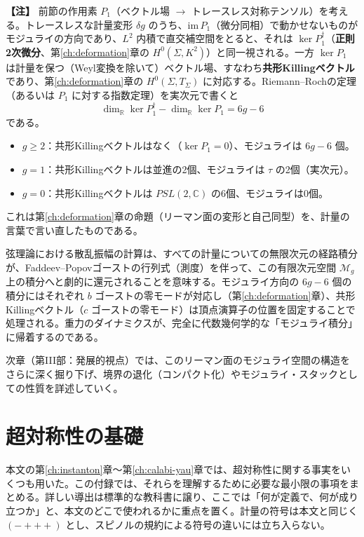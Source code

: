 \documentclass[uplatex, dvipdfmx, book]{jsbook}
\let\origsection\section
\let\origsubsection\subsection
\let\origsubsubsection\subsubsection
\newcommand{\chapter}{\origsection}
\renewcommand{\section}{\origsubsection}
\renewcommand{\subsection}{\origsubsubsection}
\renewcommand{\subsubsection}{\paragraph}
\newenvironment{note}{\vspace{1ex}\par\footnotesize\noindent\textbf{【注】}}{\par\vspace{1ex}}
\begin{document}
\begin{note}
前節の作用素 $P_1$（ベクトル場 $\to$ トレースレス対称テンソル）を考える。トレースレスな計量変形 $\delta g$ のうち、$\mathrm{im}\, P_1$（微分同相）で動かせないものがモジュライの方向であり、$L^2$ 内積で直交補空間をとると、それは $\ker P_1^\dagger$（\textbf{正則2次微分}、第\ref{ch:deformation}章の $H^0(\Sigma, K^2)$）と同一視される。一方 $\ker P_1$ は計量を保つ（Weyl変換を除いて）ベクトル場、すなわち\textbf{共形Killingベクトル}であり、第\ref{ch:deformation}章の $H^0(\Sigma, T_\Sigma)$ に対応する。Riemann--Rochの定理（あるいは $P_1$ に対する指数定理）を実次元で書くと
\begin{equation*}
    \dim_{\mathbb{R}} \ker P_1^\dagger - \dim_{\mathbb{R}} \ker P_1 = 6g - 6
\end{equation*}
である。
\begin{itemize}
    \item $g \ge 2$：共形Killingベクトルはなく（$\ker P_1 = 0$）、モジュライは $6g - 6$ 個。
    \item $g = 1$：共形Killingベクトルは並進の2個、モジュライは $\tau$ の2個（実次元）。
    \item $g = 0$：共形Killingベクトルは $PSL(2, \mathbb{C})$ の6個、モジュライは0個。
\end{itemize}
これは第\ref{ch:deformation}章の命題（リーマン面の変形と自己同型）を、計量の言葉で言い直したものである。
\end{note}

弦理論における散乱振幅の計算は、すべての計量についての無限次元の経路積分が、Faddeev--Popovゴーストの行列式（測度）を伴って、この有限次元空間 $\mathcal{M}_g$ 上の積分へと劇的に還元されることを意味する\cite{polchinskistringtheoryvolume12005}。モジュライ方向の $6g-6$ 個の積分にはそれぞれ $b$ ゴーストの零モードが対応し（第\ref{ch:deformation}章）、共形Killingベクトル（$c$ ゴーストの零モード）は頂点演算子の位置を固定することで処理される。重力のダイナミクスが、完全に代数幾何学的な「モジュライ積分」に帰着するのである。

次章（第III部：発展的視点）では、このリーマン面のモジュライ空間の構造をさらに深く掘り下げ、境界の退化（コンパクト化）やモジュライ・スタックとしての性質を詳述していく。

\appendix

\chapter{超対称性の基礎}
\label{app:susy}

本文の第\ref{ch:instanton}章〜第\ref{ch:calabi-yau}章では、超対称性に関する事実をいくつも用いた。この付録では、それらを理解するために必要な最小限の事項をまとめる。詳しい導出は標準的な教科書に譲り、ここでは「何が定義で、何が成り立つか」と、本文のどこで使われるかに重点を置く。計量の符号は本文と同じく $(-+++)$ とし、スピノルの規約による符号の違いには立ち入らない。
\end{document}
